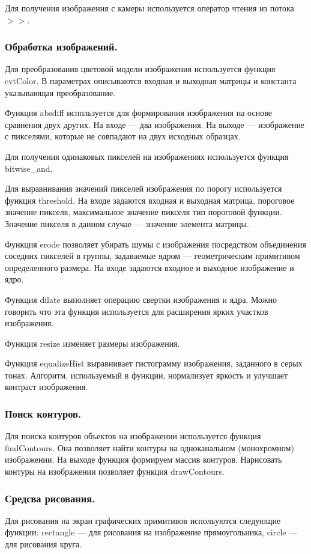 Для получения изображения с камеры используется оператор чтения из потока $>>$.

\subsubsection{Обработка изображений. }
\label{sec:program_design:opencv_elements:ocv_imgproc}
Для преобразования цветовой модели изображения используется функция cvtColor. В параметрах описываются входная и выходная матрицы и константа указывающая преобразование.

Функция absdiff используется для формирования изображения на основе сравнения двух других. На входе --- два изображения. На выходе --- изображение с пикселями, которые не совпадают на двух исходных образцах.

Для получения одинаковых пикселей на изображениях используется функция bitwise\_and.

Для выравнивания значений пикселей изображения по порогу используется функция threshold. На входе задаются входная и выходная матрица, пороговое значение пикселя, максимальное значение пикселя тип пороговой функции.
Значение пикселя в данном случае --- значение элемента матрицы.

Функция erode позволяет убирать шумы с изображения посредством объединения соседних пикселей в группы, задаваемые ядром --- геометрическим примитивом определенного размера. На входе задаются входное и выходное изображение и ядро.

Функция dilate выполняет операцию свертки изображения и ядра. Можно говорить что эта функция используется для расширения ярких участков изображения.

Функция resize изменяет размеры изображения.

Функция equalizeHist выравнивает гистограмму изображения, заданного в серых тонах. Алгоритм, используемый в функции, нормализует яркость и улучшает контраст изображения.

\subsubsection{Поиск контуров. }
\label{sec:program_design:opencv_elements:ocv_findcontours}
Для поиска контуров объектов на изображении используется функция findContours. Она позволяет найти контуры на одноканальном (монохромном) изображении.
На выходе функция формируем массив контуров.
Нарисовать контуры на изображении позволяет функция drawContours.

\subsubsection{Средсва рисования. }
\label{sec:program_design:opencv_elements:ocv_drawfeatures}
Для рисования на экран графических примитивов испольуются следующие функции: rectangle --- для рисования на изображение прямоугольника, circle --- для рисования круга.


